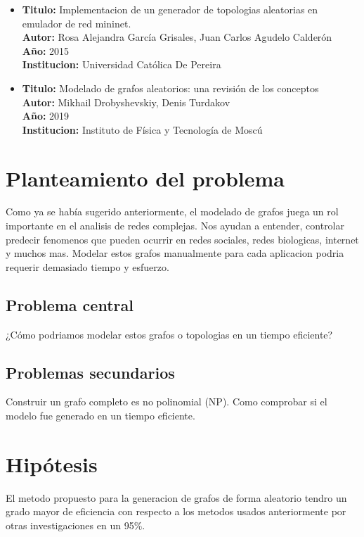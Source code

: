 \documentclass[11pt]{extarticle}
\begin{document}
\begin{itemize}
  \item \textbf{Titulo:} Implementacion de un generador de topologias aleatorias en emulador de red mininet.\\
  \textbf{Autor:} Rosa Alejandra García Grisales, Juan Carlos Agudelo Calderón\\
  \textbf{A\~no:} 2015\\
  \textbf{Institucion:} Universidad Católica De Pereira\\
\end{itemize}

\begin{itemize}
  \item \textbf{Titulo:} Modelado de grafos aleatorios: una revisión de los conceptos\\
  \textbf{Autor:} Mikhail Drobyshevskiy, Denis Turdakov\\
  \textbf{A\~no:} 2019\\
  \textbf{Institucion:} Instituto de Física y Tecnología de Moscú\\
\end{itemize}



\section{Planteamiento del problema}
  Como ya se hab\'ia sugerido anteriormente, el modelado de grafos juega un rol 
  importante en el analisis de redes complejas. Nos ayudan a entender, controlar
  predecir fenomenos que pueden ocurrir en redes sociales, redes biologicas, internet
  y muchos mas. Modelar estos grafos manualmente para cada aplicacion podria requerir
  demasiado tiempo y esfuerzo.
  \subsection{Problema central}
    ¿C\'omo podriamos modelar estos grafos o topologias en un tiempo eficiente?
  \subsection{Problemas secundarios}
    \begin{itemize}
      \guion Construir un grafo completo es no polinomial (NP). 
      \guion Como comprobar si el modelo fue generado en un tiempo eficiente.
    \end{itemize}
\section{Hip\'otesis}
  El metodo propuesto para la generacion de grafos de forma aleatorio 
  tendro un grado mayor de eficiencia con respecto a los metodos
  usados anteriormente por otras investigaciones en un 95\%.
\end{document}
